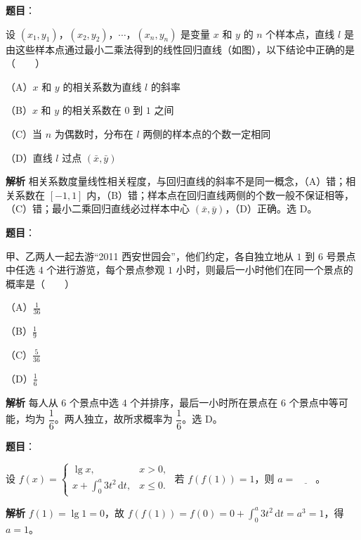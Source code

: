 \begin{answer}

\textbf{题目}：

设 $(x_1,y_1)$，$(x_2,y_2)$，$\cdots$，$(x_n,y_n)$ 是变量 $x$ 和 $y$ 的 $n$ 个样本点，直线 $l$ 是由这些样本点通过最小二乘法得到的线性回归直线（如图），以下结论中正确的是\mbox{（　　）}

（A）$x$ 和 $y$ 的相关系数为直线 $l$ 的斜率

（B）$x$ 和 $y$ 的相关系数在 $0$ 到 $1$ 之间

（C）当 $n$ 为偶数时，分布在 $l$ 两侧的样本点的个数一定相同

（D）直线 $l$ 过点 $(\bar x,\bar y)$
\nopagebreak[4]
\begin{center}\end{center}
\nopagebreak[4]
\textbf{解析}
相关系数度量线性相关程度，与回归直线的斜率不是同一概念，（A）错；相关系数在 $[-1,1]$ 内，（B）错；样本点在回归直线两侧的个数一般不保证相等，（C）错；最小二乘回归直线必过样本中心 $(\bar x,\bar y)$，（D）正确。选 D。


\end{answer}
\begin{answer}

\textbf{题目}：

甲、乙两人一起去游“2011 西安世园会”，他们约定，各自独立地从 $1$ 到 $6$ 号景点中任选 $4$ 个进行游览，每个景点参观 $1$ 小时，则最后一小时他们在同一个景点的概率是\mbox{（　　）}

（A）$\frac1{36}$

（B）$\frac19$

（C）$\frac5{36}$

（D）$\frac16$

\textbf{解析}
每人从 $6$ 个景点中选 $4$ 个并排序，最后一小时所在景点在 $6$ 个景点中等可能，均为 $\dfrac16$。两人独立，故所求概率为 $\dfrac16$。选 D。


\end{answer}
\begin{answer}

\textbf{题目}：

设 $f(x)=\begin{cases}\lg x,&x>0,\\[2pt]x+\displaystyle\int_0^a3t^2\,\mathrm dt,&x\leqslant0.\end{cases}$ 若 $f(f(1))=1$，则 $a=\underline{\qquad}$。

\textbf{解析}
$f(1)=\lg1=0$，故 $f(f(1))=f(0)=0+\displaystyle\int_0^a3t^2\,\mathrm dt=a^3=1$，得 $a=1$。


\end{answer}

